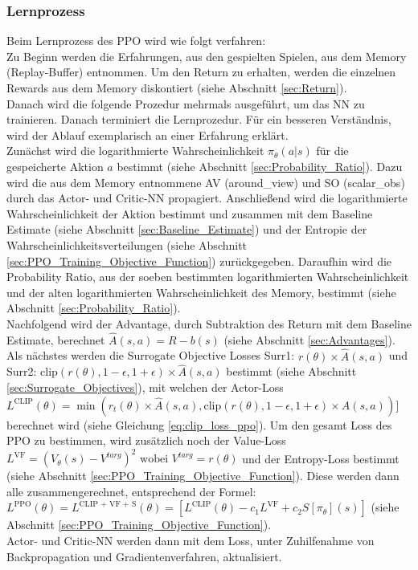 \subsubsection{Lernprozess} \label{sec:Konzept_Lernprozess_PPO}
Beim Lernprozess des PPO wird wie folgt verfahren:\\
Zu Beginn werden die Erfahrungen, aus den gespielten Spielen, aus dem Memory (Replay-Buffer) entnommen.
Um den Return zu erhalten, werden die einzelnen Rewards aus dem Memory diskontiert (siehe Abschnitt \ref{sec:Return}).\\
Danach wird die folgende Prozedur mehrmals ausgeführt, um das NN zu trainieren. Danach terminiert die Lernprozedur.
Für ein besseren Verständnis, wird der Ablauf exemplarisch an einer Erfahrung erklärt.\\
Zunächst wird die logarithmierte Wahrscheinlichkeit $\pi_{\theta}(a|s)$ für die gespeicherte Aktion $a$ bestimmt (siehe Abschnitt \ref{sec:Probability_Ratio}). Dazu wird die aus dem Memory entnommene AV (around\_view) und SO (scalar\_obs) durch das Actor- und Critic-NN propagiert. Anschließend wird die logarithmierte Wahrscheinlichkeit der Aktion bestimmt und zusammen mit dem Baseline Estimate (siehe Abschnitt \ref{sec:Baseline_Estimate}) und der Entropie der Wahrscheinlichkeitsverteilungen (siehe Abschnitt \ref{sec:PPO_Training_Objective_Function}) zurückgegeben.
Daraufhin wird die Probability Ratio, aus der soeben bestimmten logarithmierten Wahrscheinlichkeit und der alten logarithmierten Wahrscheinlichkeit des Memory, bestimmt (siehe Abschnitt \ref{sec:Probability_Ratio}).\\
Nachfolgend wird der Advantage, durch Subtraktion des Return mit dem Baseline Estimate, berechnet $\hat{A}(s, a) = R - b(s)$ (siehe Abschnitt \ref{sec:Advantages}).\\
Als nächstes werden die Surrogate Objective Losses Surr1: $r(\theta) \times \hat{A}(s, a)$ und 
Surr2: $\text{clip}(r(\theta), 1 - \epsilon, 1 + \epsilon) \times \hat{A}(s, a)$ bestimmt (siehe Abschnitt \ref{sec:Surrogate_Objectives}), mit welchen der Actor-Loss $L^\text{CLIP} (\theta) = \min(r_{t}(\theta) \times \hat{A}(s, a), \text{clip}(r(\theta), 1 - \epsilon, 1 + \epsilon) \times \hat{A}(s, a))]$ berechnet wird (siehe Gleichung \ref{eq:clip_loss_ppo}).
Um den gesamt Loss des PPO zu bestimmen, wird zusätzlich noch der Value-Loss $L^{\text{VF}} = (V_{\theta}(s)-V^{targ})^2 \text{ wobei } V^{targ} = r(\theta)$ und der Entropy-Loss bestimmt (siehe Abschnitt \ref{sec:PPO_Training_Objective_Function}). Diese werden dann alle zusammengerechnet, entsprechend der Formel: 
$L^\text{PPO} (\theta) = L^\text{CLIP + VF + S} (\theta) = [L^{\text{CLIP}} (\theta) - c_{1}L^{\text{VF}} + c_{2}S[\pi_{\theta}](s)]$ (siehe Abschnitt \ref{sec:PPO_Training_Objective_Function}).\\
Actor- und Critic-NN werden dann mit dem Loss, unter Zuhilfenahme von Backpropagation und Gradientenverfahren, aktualisiert.

